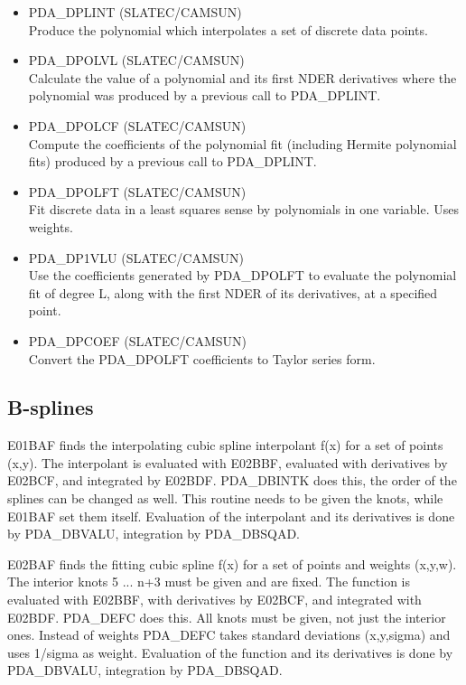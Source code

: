 \documentclass[11pt,twoside]{article}
\newcommand{\htmlref}[2]{#1}
\newcommand{\xlabel}[1]{}
\begin{document}
\begin{itemize}
\item \htmlref{PDA\_DPLINT}{PDA\_DPLINT} (SLATEC/CAMSUN)\ \\
   Produce the polynomial which interpolates a set of discrete data
   points.
\item \htmlref{PDA\_DPOLVL}{PDA\_DPOLVL} (SLATEC/CAMSUN)\ \\
   Calculate the value of a polynomial and its first NDER derivatives
   where the polynomial was produced by a previous call to PDA\_DPLINT.
\item \htmlref{PDA\_DPOLCF}{PDA\_DPOLCF} (SLATEC/CAMSUN)\ \\
   Compute the coefficients of the polynomial fit (including Hermite
   polynomial fits) produced by a previous call to PDA\_DPLINT.

\item \htmlref{PDA\_DPOLFT}{PDA\_DPOLFT} (SLATEC/CAMSUN)\ \\
   Fit discrete data in a least squares sense by polynomials in one
   variable. Uses weights.
\item \htmlref{PDA\_DP1VLU}{PDA\_DP1VLU} (SLATEC/CAMSUN)\ \\
   Use the coefficients generated by PDA\_DPOLFT to evaluate the
   polynomial fit of degree L, along with the first NDER of its
   derivatives, at a specified point.
\item \htmlref{PDA\_DPCOEF}{PDA\_DPCOEF} (SLATEC/CAMSUN)\ \\
   Convert the PDA\_DPOLFT coefficients to Taylor series form.

\end{itemize}


\subsection{\xlabel{b-splines}B-splines}

   E01BAF finds the interpolating cubic spline interpolant f(x) for a
   set of points (x,y). The interpolant is evaluated with E02BBF,
   evaluated with
   derivatives by E02BCF, and integrated by E02BDF. PDA\_DBINTK
   does this, the order of the splines can be changed as well. This
   routine needs to be given the knots, while E01BAF set them itself.
   Evaluation of the interpolant and its derivatives is done by
   PDA\_DBVALU, integration by PDA\_DBSQAD.

   E02BAF finds the fitting cubic spline f(x) for a set of points and
   weights (x,y,w). The interior knots 5 ... n+3 must be given and are
   fixed. The function is evaluated with E02BBF, with derivatives by
   E02BCF, and integrated with E02BDF. PDA\_DEFC does this. All knots must be
   given, not just the interior ones.
   Instead of weights PDA\_DEFC takes standard deviations (x,y,sigma) and uses
   1/sigma as weight. Evaluation of the function and its derivatives is
   done by PDA\_DBVALU, integration by PDA\_DBSQAD.
\end{document}
